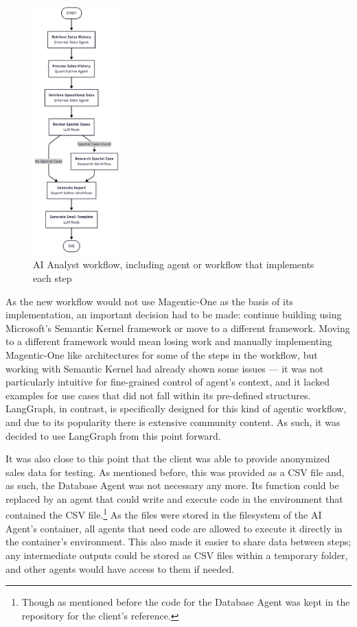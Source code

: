 \documentclass[a4paper]{report}
\begin{document}
\begin{figure}[h]
\centering
\includegraphics[width=0.3\textwidth]{images/workflow.png}
\caption{AI Analyst workflow, including agent or workflow that implements each step}
\label{fig:workflow}
\end{figure}

As the new workflow would not use Magentic-One as the basis of its implementation, an important decision had to be made: continue building using Microsoft's Semantic Kernel framework or move to a different framework. Moving to a different framework would mean losing work and manually implementing Magentic-One like architectures for some of the steps in the workflow, but working with Semantic Kernel had already shown some issues --- it was not particularly intuitive for fine-grained control of agent's context, and it lacked examples for use cases that did not fall within its pre-defined structures. LangGraph, in contrast, is specifically designed for this kind of agentic workflow, and due to its popularity there is extensive community content. As such, it was decided to use LangGraph from this point forward.

It was also close to this point that the client was able to provide anonymized sales data for testing. As mentioned before, this was provided as a CSV file and, as such, the Database Agent was not necessary any more. Its function could be replaced by an agent that could write and execute code in the environment that contained the CSV file.\footnote{Though as mentioned before the code for the Database Agent was kept in the repository for the client's reference.} As the files were stored in the filesystem of the AI Agent's container, all agents that need code are allowed to execute it directly in the container's environment. This also made it easier to share data between steps; any intermediate outputs could be stored as CSV files within a temporary folder, and other agents would have access to them if needed.
\end{document}
